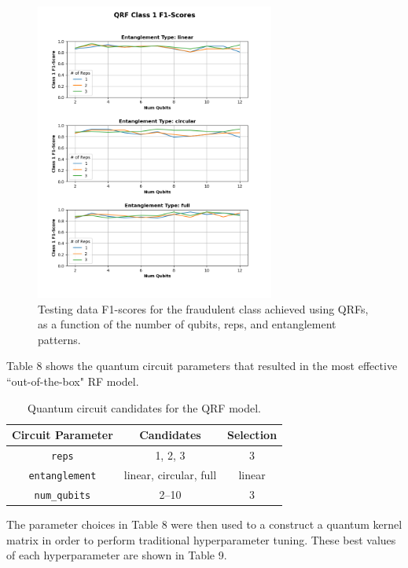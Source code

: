 \documentclass[11pt, oneside]{article}   	%
\begin{document}
\begin{figure}[h!]
	\centering
	\includegraphics[width=0.7\textwidth]{figures/fig_14.png}
	\captionsetup{font=small} 
	\caption{Testing data F1-scores for the fraudulent class achieved using QRFs, as a function of the number of qubits, reps, and entanglement patterns.}
	\label{fig14}
\end{figure}

Table 8 shows the quantum circuit parameters that resulted in the most effective ``out-of-the-box" RF model. 

\begin{table}[h!]
	\centering
	\begin{tabular}{|c|c|c|}
		\hline
		\textbf{Circuit Parameter} & \textbf{Candidates} & \textbf{Selection} \\ \hline
		\texttt{reps} & 1, 2, 3 & 3 \\ \hline
		\texttt{entanglement} & linear, circular, full & linear \\ \hline
		\texttt{num\_qubits} & 2--10 & 3\\ \hline
	\end{tabular}
	\caption{Quantum circuit candidates for the QRF model.}
	\label{tab6}
\end{table}

The parameter choices in Table 8 were then used to a construct a quantum kernel matrix in order to perform traditional hyperparameter tuning. These best values of each hyperparameter are shown in Table 9. 
\end{document}
